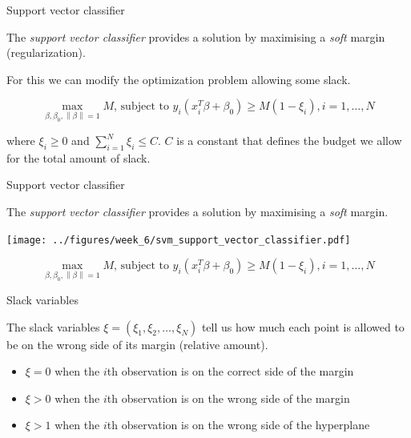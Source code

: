 \documentclass[notes]{beamer}          %
\newcommand{\norm}[1]{\left\lVert#1\right\rVert}
\providecommand{\norm}[1]{\lVert#1\rVert}
\begin{document}
\begin{frame}{Support vector classifier}

The \textit{support vector classifier} provides a solution by maximising a \textit{soft} margin (regularization).

\vspace{5mm}

For this we can modify the optimization problem allowing some slack.

\begin{equation*}
\max_{\beta, \beta_0, \norm{\beta} = 1} M \text{, subject to } y_i(x^T_i \beta + \beta_0) \geq M (1-\xi_i), i=1, \dots, N
\end{equation*}

where $\xi_i \geq 0$ and $\sum_{i=1}^N \xi_i \leq C$. $C$ is a constant that defines the budget we allow for the total amount of slack.

\vspace{5mm}



\end{frame}


\begin{frame}{Support vector classifier}

The \textit{support vector classifier} provides a solution by maximising a \textit{soft} margin.
\begin{center}
\texttt{[image: ../figures/week\_6/svm\_support\_vector\_classifier.pdf]}  
\end{center}

\vspace{-7mm} 

\begin{equation*}
\max_{\beta, \beta_0, \norm{\beta} = 1} M \text{, subject to } y_i(x^T_i \beta + \beta_0) \geq M (1-\xi_i), i=1, \dots, N
\end{equation*}

\end{frame}

\begin{frame}{Slack variables}

The slack variables $\xi = (\xi_1, \xi_2, \dots, \xi_N)$ tell us how much each point is allowed to be on the wrong side of its margin (relative amount).

\begin{itemize}
    \item $\xi = 0$ when the $i$th observation is on the correct side of the margin
    \item $\xi > 0$ when the $i$th observation is on the wrong side of the margin
    \item $\xi > 1$ when the $i$th observation is on the wrong side of the hyperplane
\end{itemize}


\end{frame}
\end{document}
